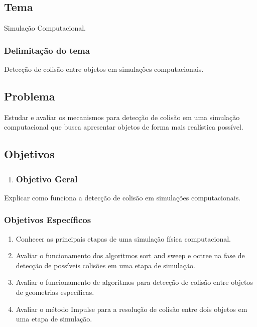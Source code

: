 \chapter*[]{}

\section{Tema}

Simulação Computacional.

\subsection{Delimitação do tema}

Detecção de colisão entre objetos em simulações computacionais.

\section{Problema}

 Estudar e avaliar os mecanismos para detecção de colisão em uma simulação computacional que busca apresentar objetos de forma mais realística possível.


\section{Objetivos}

\begin{enumerate}
\item \subsection{Objetivo Geral}
\end{enumerate}

Explicar como funciona a detecção de colisão em simulações computacionais.

\subsection{Objetivos Específicos}
\begin{enumerate}
\item Conhecer as principais etapas de uma simulação física computacional.
\item Avaliar o funcionamento dos algoritmos sort and sweep e octree na fase de detecção de possíveis colisões em uma etapa de simulação.
\item Avaliar o funcionamento de algoritmos para detecção de colisão entre objetos de geometrias específicas.
\item Avaliar o método Impulse para a resolução de colisão entre dois objetos em uma etapa de simulação.
\end{enumerate}

